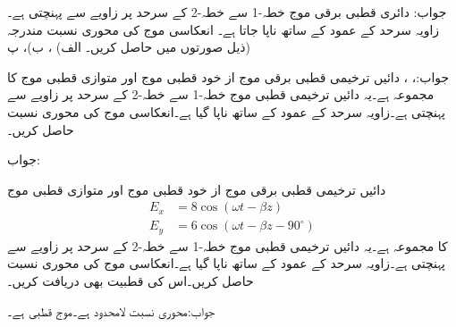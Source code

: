 جواب:
دائری قطبی برقی موج خطہ-1  سے خطہ-2   کے سرحد پر  زاویے سے  پہنچتی ہے۔زاویہ سرحد کے عمود کے ساتھ ناپا جاتا ہے۔ انعکاسی موج کی محوری نسبت مندرجہ ذیل صورتوں میں حاصل کریں۔ الف) ،
 ب)، پ) 

جواب:، ، 
دائیں ترخیمی قطبی برقی موج از خود  قطبی موج   اور متوازی قطبی موج   کا مجموعہ ہے۔یہ دائیں ترخیمی قطبی موج خطہ-1  سے خطہ-2   کے سرحد  پر  زاویے سے  پہنچتی ہے۔زاویہ سرحد کے عمود کے ساتھ ناپا گیا ہے۔انعکاسی موج کی محوری نسبت حاصل کریں۔

جواب:

دائیں ترخیمی قطبی برقی موج از خود  قطبی موج  اور     متوازی قطبی موج 
\begin{align*}
E_x&=8\cos(\omega t -\beta z)\\
E_y&=6\cos(\omega t -\beta z -90^{\circ})
\end{align*}
  کا مجموعہ ہے۔یہ دائیں ترخیمی قطبی موج خطہ-1  سے خطہ-2   کے سرحد  پر  زاویے سے  پہنچتی ہے۔زاویہ سرحد کے عمود کے ساتھ ناپا گیا ہے۔انعکاسی موج کی محوری نسبت حاصل کریں۔اس کی قطبیت بھی دریافت کریں۔

جواب:محوری نسبت لامحدود ہے۔موج  قطبی ہے۔

